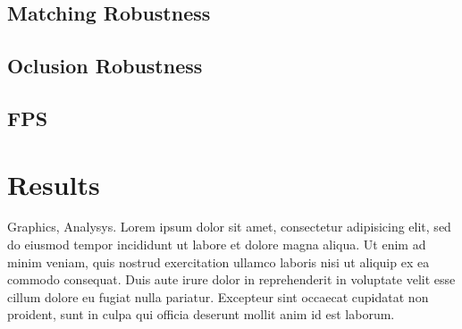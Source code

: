 \subsection{Matching Robustness} %
\label{sub:evaluation:evaluation_methodology:matching_robustness}


\subsection{Oclusion Robustness} %
\label{sub:evaluation:evaluation_methodology:oclusion_robustness}


\subsection{FPS} %
\label{sub:evaluation:evaluation_methodology:fps}



\section{Results} %
\label{sec:evaluation:results}

Graphics, Analysys.
Lorem ipsum dolor sit amet, consectetur adipisicing elit, sed do eiusmod
tempor incididunt ut labore et dolore magna aliqua. Ut enim ad minim veniam,
quis nostrud exercitation ullamco laboris nisi ut aliquip ex ea commodo
consequat. Duis aute irure dolor in reprehenderit in voluptate velit esse
cillum dolore eu fugiat nulla pariatur. Excepteur sint occaecat cupidatat non
proident, sunt in culpa qui officia deserunt mollit anim id est laborum.


